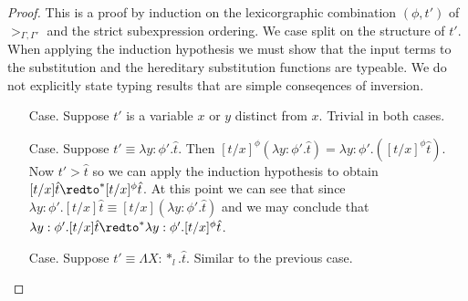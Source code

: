 \begin{proof}
  This is a proof by induction on the lexicorgraphic combination
$(\phi, t')$ of $>_{\Gamma,\Gamma'}$ and the strict subexpression ordering.
We case split on the structure of $t'$.  When applying
the induction hypothesis we must show that the input terms to the
substitution and the hereditary substitution functions are typeable.
We do not explicitly state typing results that are simple
conseqences of inversion.

\begin{itemize}
\item[Case.] Suppose $t'$ is a variable $x$ or $y$ distinct from $x$.  
  Trivial in both cases.
  
\item[Case.] Suppose $t' \equiv \lambda y:\phi'.\hat{t}$.  Then
  $[t/x]^\phi (\lambda y:\phi'.\hat{t}) = \lambda y:\phi'.([t/x]^\phi \hat{t})$. 
  Now $t' > \hat{t}$ so we can apply the induction hypothesis to obtain 
  $[t/x]\hat{t} \redto^* [t/x]^\phi \hat{t}$.  At this point we can see that since 
  $\lambda y:\phi'.[t/x]\hat{t} \equiv [t/x](\lambda y:\phi'.\hat{t})$ and we may
  conclude that $\lambda y:\phi'.[t/x]\hat{t} \redto^* \lambda y:\phi'.[t/x]^\phi \hat{t}$.
  
\item[Case.] Suppose $t' \equiv \Lambda X:*_l.\hat{t}$.  Similar to the previous case.  


\end{itemize}
\end{proof}
